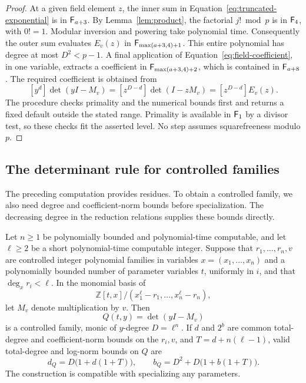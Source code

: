 \begin{proof}
At a given field element $z$, the inner sum in
Equation~\eqref{eq:truncated-exponential} is in $\mathsf F_{a+3}$.
By Lemma~\ref{lem:product}, the factorial $j!\bmod p$ is in
$\mathsf F_{4}$, with $0!=1$.  Modular inversion and powering take
polynomial time.  Consequently the outer sum evaluates $E_v(z)$ in
$\mathsf F_{\max(a+3,4)+1}$.  This entire polynomial has degree at most
$D^2<p-1$.  A final application of
Equation~\eqref{eq:field-coefficient}, in one variable, extracts a
coefficient in $\mathsf F_{\max(a+3,4)+2}$, which is contained in
$\mathsf F_{a+8}$.  The required coefficient is obtained from
\[
 [y^d]\det(yI-M_v)=[z^{D-d}]\det(I-zM_v)
                  =[z^{D-d}]E_v(z).
\]
The procedure checks primality and the numerical bounds first and
returns a fixed default outside the stated range.  Primality is
available in $\mathsf F_{1}$ by a divisor test, so these checks fit the
asserted level.  No step assumes squarefreeness modulo $p$.
\end{proof}

\subsection{The determinant rule for controlled families}

The preceding computation provides residues.  To obtain a controlled
family, we also need degree and coefficient-norm bounds before
specialization.  The decreasing degree in the reduction relations
supplies these bounds directly.

\begin{proposition}
\label{prop:multiplication-determinant}
Let $n\ge1$ be polynomially bounded and polynomial-time computable,
and let $\ell\ge2$ be a short polynomial-time computable integer.
Suppose that $r_1,\ldots,r_n,v$ are controlled integer polynomial
families in variables $x=(x_1,\ldots,x_n)$ and a polynomially bounded
number of parameter variables $t$, uniformly in $i$, and that
$\deg_x r_i<\ell$.  In the monomial basis of
\[
 \mathbb Z[t,x]/(x_1^\ell-r_1,\ldots,x_n^\ell-r_n),
\]
let $M_v$ denote multiplication by $v$.  Then
\begin{equation}\label{eq:controlled-characteristic}
 Q(t,y)=\det(yI-M_v)
\end{equation}
is a controlled family, monic of $y$-degree $D=\ell^n$.
If $d$ and $2^b$ are common total-degree and coefficient-norm bounds
on the $r_i,v$, and $T=d+n(\ell-1)$, valid total-degree and
log-norm bounds on $Q$ are
\begin{equation}\label{eq:determinant-size-bounds}
 d_Q=D\bigl(1+d(1+T)\bigr),\qquad
 b_Q=D^2+D\bigl(1+b(1+T)\bigr).
\end{equation}
The construction is compatible with specializing any parameters.
\end{proposition}


